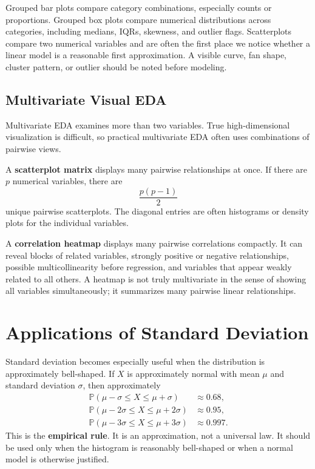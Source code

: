 {Grouped bar plots compare category combinations, especially counts or proportions.  Grouped box plots compare numerical distributions across categories, including medians, IQRs, skewness, and outlier flags.  Scatterplots compare two numerical variables and are often the first place we notice whether a linear model is a reasonable first approximation.  A visible curve, fan shape, cluster pattern, or outlier should be noted before modeling.

\subsection{Multivariate Visual EDA}

Multivariate EDA examines more than two variables.  True high-dimensional visualization is difficult, so practical multivariate EDA often uses combinations of pairwise views.

A \textbf{scatterplot matrix} displays many pairwise relationships at once.  If there are $p$ numerical variables, there are
\begin{equation}
  \frac{p(p-1)}{2}
\end{equation}
unique pairwise scatterplots.  The diagonal entries are often histograms or density plots for the individual variables.

A \textbf{correlation heatmap} displays many pairwise correlations compactly.  It can reveal blocks of related variables, strongly positive or negative relationships, possible multicollinearity before regression, and variables that appear weakly related to all others.  A heatmap is not truly multivariate in the sense of showing all variables simultaneously; it summarizes many pairwise linear relationships.

\section{Applications of Standard Deviation}

Standard deviation becomes especially useful when the distribution is approximately bell-shaped.  If $X$ is approximately normal with mean $\mu$ and standard deviation $\sigma$, then approximately
\begin{align}
  \mathbb{P}(\mu-\sigma \le X \le \mu+\sigma) &\approx 0.68,\\
  \mathbb{P}(\mu-2\sigma \le X \le \mu+2\sigma) &\approx 0.95,\\
  \mathbb{P}(\mu-3\sigma \le X \le \mu+3\sigma) &\approx 0.997.
\end{align}
This is the \textbf{empirical rule}.  It is an approximation, not a universal law.  It should be used only when the histogram is reasonably bell-shaped or when a normal model is otherwise justified.

}

